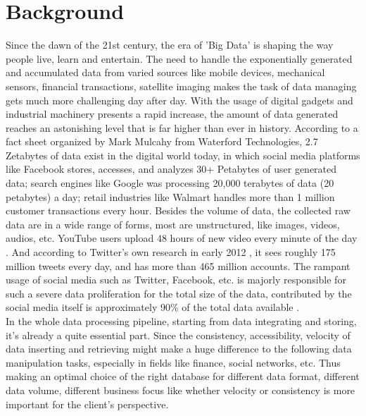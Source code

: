 \section{Background}


Since the dawn of the 21st century, the era of 'Big Data' is shaping the way people live, learn and entertain. 
The need to handle the exponentially generated and accumulated data from varied sources like mobile devices, mechanical sensors, financial transactions,
satellite imaging makes the task of data managing gets much more challenging
day after day. 
With the usage of digital gadgets and industrial machinery presents a rapid increase, the amount of data generated reaches an astonishing level that is far higher than ever in history. 
According to a fact sheet organized by Mark Mulcahy \cite{factsheet} from Waterford Technologies, 2.7 Zetabytes of data exist in the digital world today, in which social media platforms like Facebook stores, accesses, and analyzes 30+ Petabytes of user generated data; search engines like Google was processing 20,000 terabytes of data (20 petabytes) a day; retail industries like Walmart handles more than 1 million customer transactions every hour. 
Besides the volume of data, the collected raw data are in a wide range of
forms, most are unstructured, like images, videos, audios, etc. YouTube users upload 48 hours of new video every minute of the day \cite{youtube}. And according to Twitter's own research in early 2012 \cite{factsheet}, it sees roughly 175 million tweets every day, and has more than 465 million accounts. The rampant usage of social media such as Twitter, Facebook, etc. is majorly responsible for such a severe data proliferation for the total size of the
data, contributed by the social media itself is approximately 90\% of the total data available \cite{DBLP:journals/corr/Sharma15b}.  \\

In the
whole data processing pipeline, starting from data integrating and
storing, it's already a quite essential part. Since the consistency,
accessibility, velocity of data inserting and retrieving might make a
huge difference to the following data manipulation tasks, especially in
fields like finance, social networks, etc. Thus making an optimal choice
of the right database for different data format, different data volume,
different business focus like whether velocity or consistency is more
important for the client's perspective.

